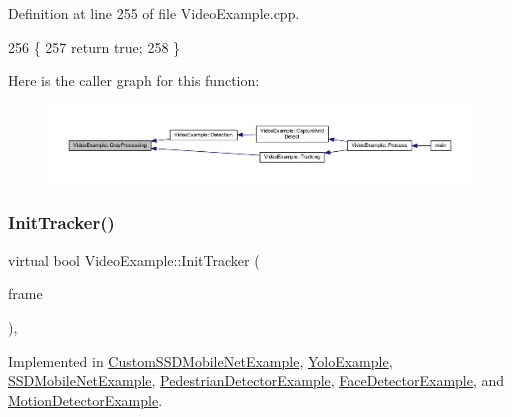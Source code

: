 Definition at line 255 of file Video\+Example.\+cpp.


\begin{DoxyCode}
256 \{
257     \textcolor{keywordflow}{return} \textcolor{keyword}{true};
258 \}
\end{DoxyCode}
Here is the caller graph for this function\+:
\nopagebreak
\begin{figure}[H]
\begin{center}
\leavevmode
\includegraphics[width=350pt]{class_video_example_af8ea44f17711129d2b954d1f01fee1f0_icgraph}
\end{center}
\end{figure}
\mbox{\label{class_video_example_a93e23d64075fb2f508423e45d15c5421}} 
\subsubsection{\texorpdfstring{Init\+Tracker()}{InitTracker()}}
{\footnotesize\ttfamily virtual bool Video\+Example\+::\+Init\+Tracker (\begin{DoxyParamCaption}\item[{cv\+::\+U\+Mat}]{frame }\end{DoxyParamCaption})\hspace{0.3cm}{\ttfamily [protected]}, {}}



Implemented in \mbox{\hyperlink{class_custom_s_s_d_mobile_net_example_a5d5c5184860ac247bd2f562d6678e5e2}{Custom\+S\+S\+D\+Mobile\+Net\+Example}}, \mbox{\hyperlink{class_yolo_example_a60980995a54b8bcfcf94bd4e04d0eeaa}{Yolo\+Example}}, \mbox{\hyperlink{class_s_s_d_mobile_net_example_a1583e70ecd77cf3c67a062a848acc044}{S\+S\+D\+Mobile\+Net\+Example}}, \mbox{\hyperlink{class_pedestrian_detector_example_aae97de4cc14d29aa81b446ea66fa9abc}{Pedestrian\+Detector\+Example}}, \mbox{\hyperlink{class_face_detector_example_a605d06dff8405d78a99ef3c383e88ad5}{Face\+Detector\+Example}}, and \mbox{\hyperlink{class_motion_detector_example_ae814c565a7d6a9dbab9e8a99c790a77f}{Motion\+Detector\+Example}}.

